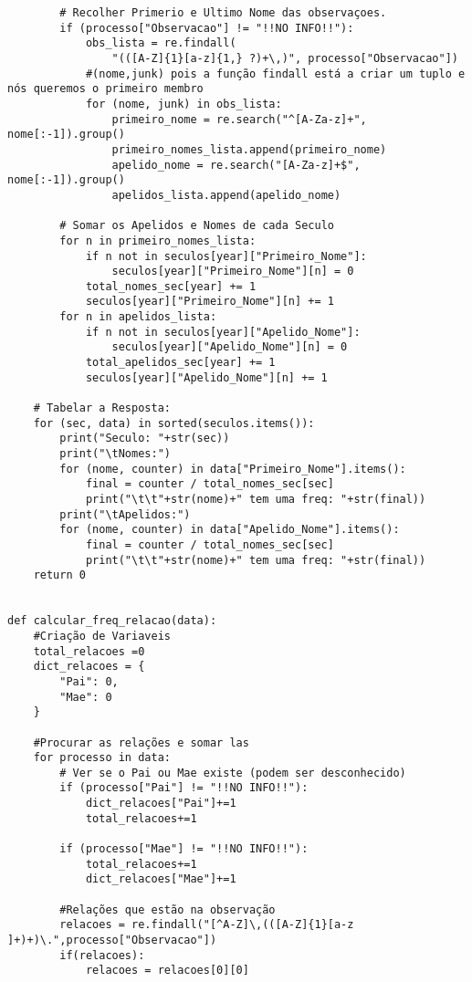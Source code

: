 \documentclass[11pt,a4paper]{report}%
\begin{document}
\begin{verbatim}
        # Recolher Primerio e Ultimo Nome das observaçoes.
        if (processo["Observacao"] != "!!NO INFO!!"):
            obs_lista = re.findall(
                "(([A-Z]{1}[a-z]{1,} ?)+\,)", processo["Observacao"])
            #(nome,junk) pois a função findall está a criar um tuplo e nós queremos o primeiro membro
            for (nome, junk) in obs_lista:
                primeiro_nome = re.search("^[A-Za-z]+", nome[:-1]).group()
                primeiro_nomes_lista.append(primeiro_nome)
                apelido_nome = re.search("[A-Za-z]+$", nome[:-1]).group()
                apelidos_lista.append(apelido_nome)

        # Somar os Apelidos e Nomes de cada Seculo
        for n in primeiro_nomes_lista:
            if n not in seculos[year]["Primeiro_Nome"]:
                seculos[year]["Primeiro_Nome"][n] = 0
            total_nomes_sec[year] += 1
            seculos[year]["Primeiro_Nome"][n] += 1
        for n in apelidos_lista:
            if n not in seculos[year]["Apelido_Nome"]:
                seculos[year]["Apelido_Nome"][n] = 0
            total_apelidos_sec[year] += 1
            seculos[year]["Apelido_Nome"][n] += 1

    # Tabelar a Resposta:
    for (sec, data) in sorted(seculos.items()):
        print("Seculo: "+str(sec))
        print("\tNomes:")
        for (nome, counter) in data["Primeiro_Nome"].items():
            final = counter / total_nomes_sec[sec]
            print("\t\t"+str(nome)+" tem uma freq: "+str(final))
        print("\tApelidos:")
        for (nome, counter) in data["Apelido_Nome"].items():
            final = counter / total_nomes_sec[sec]
            print("\t\t"+str(nome)+" tem uma freq: "+str(final))
    return 0


def calcular_freq_relacao(data):
    #Criação de Variaveis
    total_relacoes =0
    dict_relacoes = {
        "Pai": 0,
        "Mae": 0
    }

    #Procurar as relações e somar las
    for processo in data:
        # Ver se o Pai ou Mae existe (podem ser desconhecido)
        if (processo["Pai"] != "!!NO INFO!!"):
            dict_relacoes["Pai"]+=1
            total_relacoes+=1

        if (processo["Mae"] != "!!NO INFO!!"):
            total_relacoes+=1
            dict_relacoes["Mae"]+=1

        #Relações que estão na observação
        relacoes = re.findall("[^A-Z]\,(([A-Z]{1}[a-z ]+)+)\.",processo["Observacao"])
        if(relacoes):
            relacoes = relacoes[0][0]


\end{verbatim}
\end{document}
